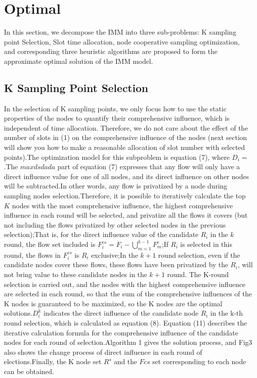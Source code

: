 \documentclass[conference,compsoc]{IEEEtran}
\begin{document}
\section{Optimal}
In this section, we decompose the IMM into three sub-problems: K sampling point Selection, Slot time allocation, node cooperative sampling optimization, and corresponding three heuristic algorithms are proposed to form the approximate optimal solution of the IMM model.
\subsection{K Sampling Point Selection} 
In the selection of K sampling points, we only focus how to use the static properties of the nodes to quantify their comprehensive influence, which is independent of time allocation. Therefore, we do not care about the effect of the number of slots in (1) on the comprehensive influence of the nodes (next section will show you how to make a reasonable allocation of slot number with selected points).The optimization model for this subproblem is equation (7), where $D_i=$.The $max{dsdada}$ part of equation (7) expresses that any flow will only have a direct influence value for one of all nodes, and its direct influence on other nodes will be subtracted.In other words, any flow is privatized by a node during sampling nodes selection.Therefore, it is possible to iteratively calculate the top $K$ nodes with the most comprehensive influence, the highest comprehensive influence in each round will be selected, and privatize all the flows it covers (but not including the flows privatized by other selected nodes in the previous selection);That is, for the direct influence value of the candidate $R_i$ in the $k$ round, the flow set included is $F^{cs}_i = F_i- \bigcup_{m=1}^{k-1}F_m^c$;If $R_i$ is selected in this round,  the flows in $F^{cs}_i$ is $R_i$ exclusive;In the $k+1$ round selection, even if the candidate nodes cover these flows, these flows have been privatized by the $R_i$, will not bring value to these candidate nodes in the $k+1$ round. The K-round selection is carried out, and the nodes with the highest comprehensive influence are selected in each round, so that the sum of the comprehensive influences of the K nodes is guaranteed to be maximized, so the K nodes are the optimal solutions.$D_i^k$ indicates the direct influence of the candidate node $R_i$ in the k-th round selection, which is calculated as equation (8). Equation (11) describes the iterative calculation formula for the comprehensive influence of the candidate nodes for each round of selection.Algorithm 1 gives the solution process, and Fig3 also shows the change process of direct influence in each round of elections.Finally, the K node set $R^s$ and the $F{cs}$ set corresponding to each node can be obtained.
\end{document}

